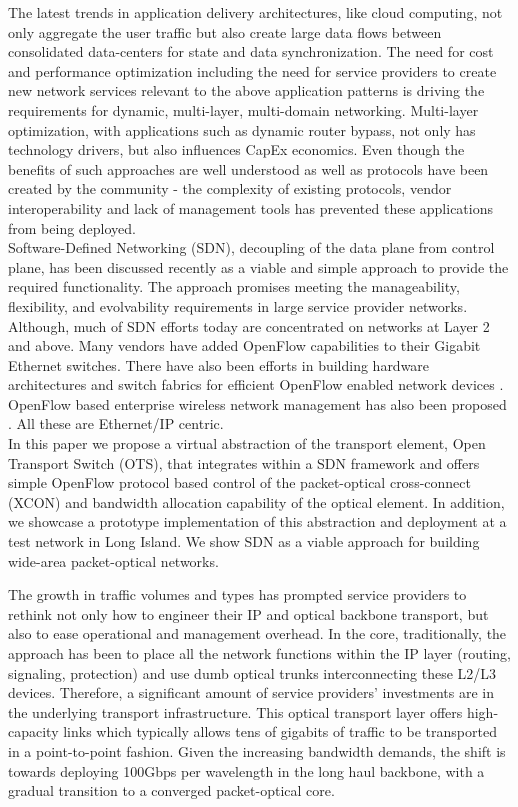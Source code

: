 \documentclass{sig-alternate-2013}
\begin{document}
	The latest trends in application delivery architectures, like cloud computing, not only aggregate the user traffic but also create large data flows between consolidated data-centers for state and data synchronization. The 	need for cost and performance optimization including the need for service providers to create new network services relevant to the above application patterns is driving the requirements for dynamic, multi-layer, multi-domain networking. Multi-layer optimization, with applications such as dynamic router bypass, not only has technology drivers, but also influences CapEx economics. Even though the benefits of such approaches are well understood as well as protocols have been created by the community - the complexity of existing protocols, vendor  interoperability and lack of management tools has prevented these applications from being deployed.\\
	
	Software-Defined Networking (SDN), decoupling of the data plane from control plane, has been discussed recently \cite{Das2012} 
	as a viable and simple approach to provide the required functionality. The approach promises meeting the manageability, flexibility, and evolvability 
	requirements in large service provider networks. Although, much of SDN efforts today are concentrated on networks at Layer 2 and above. Many vendors have
	added OpenFlow capabilities to their Gigabit Ethernet switches. There have also been efforts in building
	hardware architectures \cite{Mogul2012} and switch fabrics for efficient OpenFlow enabled network devices
	\cite{Casado2012}. OpenFlow based enterprise wireless network management has also been proposed \cite{Suresh2012}. All these are Ethernet/IP centric.\\
	
	In this paper we propose a virtual abstraction of the transport element, Open Transport Switch (OTS), that integrates within a SDN framework and
	offers simple OpenFlow protocol based control of the packet-optical cross-connect (XCON) and bandwidth allocation capability of the optical element. In addition,
	we showcase a prototype implementation of this abstraction and deployment at a test network in Long Island. We show SDN as a
	viable approach for building wide-area packet-optical networks. 

\iffalse
	The growth in traffic volumes and types has prompted service providers to rethink not only how to
	engineer their IP and optical backbone transport, but also to ease operational and management overhead.
	In the core, traditionally, the approach has been to place all the network functions within the IP layer
	(routing, signaling, protection) and use dumb optical trunks interconnecting these L2/L3 devices.
	Therefore, a significant amount of service providers' investments are in the underlying transport
	infrastructure. This optical transport layer offers high-capacity links which typically allows tens of
	gigabits of traffic to be transported in a point-to-point fashion. Given the increasing bandwidth
	demands, the shift is towards deploying 100Gbps per wavelength in the long haul backbone, with a gradual
	transition to a converged packet-optical core. \\
			
\end{document}
